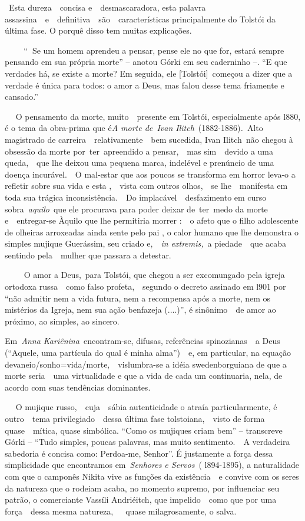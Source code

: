 ~Esta dureza~~concisa e~~desmascaradora, esta palavra
assassina~~e~~definitiva~~são~~características principalmente do Tolstói
da última fase. O porquê disso tem muitas explicações.~

\textbf{~~~~}``\textbf{~}Se um homem aprendeu a pensar, pense ele no que
for, estará sempre pensando em sua própria morte'' -- anotou Górki em
seu caderninho --. ``E que verdades há, se existe a morte? Em seguida,
ele {[}Tolstói{]}~começou a dizer que a verdade é única para todos: o
amor a Deus, mas falou desse tema friamente e cansado.''

~~ O pensamento da morte, muito~~presente em Tolstói, especialmente após
l880, é o tema da obra-prima que é\emph{A morte de~Ivan
Ilitch}~(1882-1886)\emph{.~}Alto magistrado de
carreira~~relativamente~~bem sucedida, Ivan Ilitch\emph{~}não chegou à
obsessão da morte por~ter~apreendido a pensar,~~mas sim~~devido a uma
queda,~~que lhe deixou uma pequena marca, indelével e prenúncio de uma
doença incurável.~~O mal-estar que aos poucos se transforma em horror
leva-o a refletir sobre sua vida e esta ,~~vista com outros olhos,~~se
lhe~~manifesta em toda sua trágica inconsistência.~~Do
implacável~~desfazimento em curso sobra~\emph{aquilo}~que ele procurava
para poder deixar de~ter~medo da morte e~~entregar-se Àquilo que lhe
permitiria morrer :~~o afeto que o filho adolescente de olheiras
arroxeadas ainda sente pelo pai , o calor humano que lhe demonstra o
simples mujique Guerássim, seu criado e,~~\emph{in extremis,}~a
piedade~~que acaba sentindo pela~~mulher que passara a detestar.

~~~~ O amor a Deus,~para Tolstói, que chegou a ser excomungado pela
igreja ortodoxa russa~~como falso profeta,~~segundo o decreto assinado
em l901 por ``não admitir nem a vida futura, nem a recompensa após a
morte, nem os mistérios da Igreja, nem sua ação benfazeja (....)'', é
sinônimo~~de amor ao próximo, ao simples, ao sincero.

Em~\emph{Anna Kariênina~}encontram-se, difusas, referências
spinozianas~~a Deus (``Aquele, uma partícula do qual é minha
alma'')\emph{~}~e, em particular, na equação
devaneio/sonho=vida/morte,~~vislumbra-se a idéia swedenborguiana de que
a morte seria~~uma virtualidade e que a vida de cada um continuaria,
nela, de acordo com suas tendências dominantes.

~ ~O mujique russo,~~cuja~~sábia autenticidade o atraía particularmente,
é outro~~tema privilegiado~~dessa última fase tolstoiana,~~visto de
forma quase~~mítica, quase simbólica. ``Como os mujiques criam bem'' --
transcreve Górki -- ``Tudo simples, poucas palavras, mas muito
sentimento.~~A verdadeira sabedoria é concisa como: Perdoa-me, Senhor''.
É justamente a força dessa simplicidade que encontramos
em~\emph{Senhores e Servos~}( l894-1895), a naturalidade com que o
camponês Nikita vive as funções da existência~~e convive com os seres da
natureza que o rodeiam acaba, no momento supremo, por influenciar seu
patrão, o comerciante Vassíli Andriéitch, que impelido~~como que por uma
força~~dessa mesma natureza,~~~quase milagrosamente, o salva.

